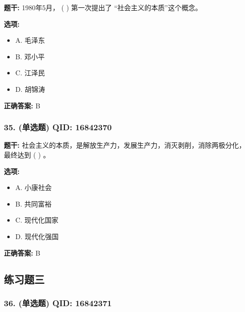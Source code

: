 \documentclass[12pt,UTF8]{ctexart}
\begin{document}
\textbf{题干:}
1980年5月， ( ) 第一次提出了 “社会主义的本质”这个概念。

\textbf{选项:}
\begin{itemize}[leftmargin=*]

  \item A. 毛泽东

  \item B. 邓小平

  \item C. 江泽民

  \item D. 胡锦涛

\end{itemize}

\textbf{正确答案:}
B

\vspace{0.3em}\hrulefill\vspace{0.7em}

\subsubsection*{35. (单选题) \small QID: 16842370}

\textbf{题干:}
社会主义的本质，是解放生产力，发展生产力，消灭剥削，消除两极分化，最终达到 ( ) 。

\textbf{选项:}
\begin{itemize}[leftmargin=*]

  \item A. 小康社会

  \item B. 共同富裕

  \item C. 现代化国家

  \item D. 现代化强国

\end{itemize}

\textbf{正确答案:}
B

\vspace{0.3em}\hrulefill\vspace{0.7em}

\subsection*{练习题三}

\subsubsection*{36. (单选题) \small QID: 16842371}
\end{document}
